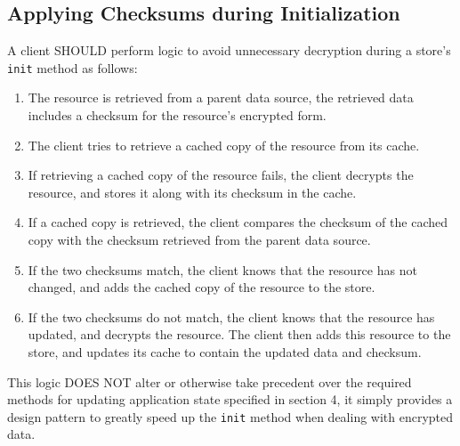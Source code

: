 \documentclass{article}
\begin{document}
\subsection{Applying Checksums during Initialization}
A client SHOULD perform logic to avoid unnecessary decryption during a store's \verb|init| method as follows:
\begin{enumerate}
    \item The resource is retrieved from a parent data source, the retrieved data includes a checksum for the resource's encrypted form.
    \item The client tries to retrieve a cached copy of the resource from its cache.
    \item If retrieving a cached copy of the resource fails, the client decrypts the resource, and stores it along with its checksum in the cache.
    \item If a cached copy is retrieved, the client compares the checksum of the cached copy with the checksum retrieved from the parent data source.
    \item If the two checksums match, the client knows that the resource has not changed, and adds the cached copy of the resource to the store.
    \item If the two checksums do not match, the client knows that the resource has updated, and decrypts the resource. The client then adds this resource to the store, and updates its cache to contain the updated data and checksum.
\end{enumerate}
This logic DOES NOT alter or otherwise take precedent over the required methods for updating application state specified in section 4, it simply provides a design pattern to greatly speed up the \verb|init| method when dealing with encrypted data.
\end{document}
